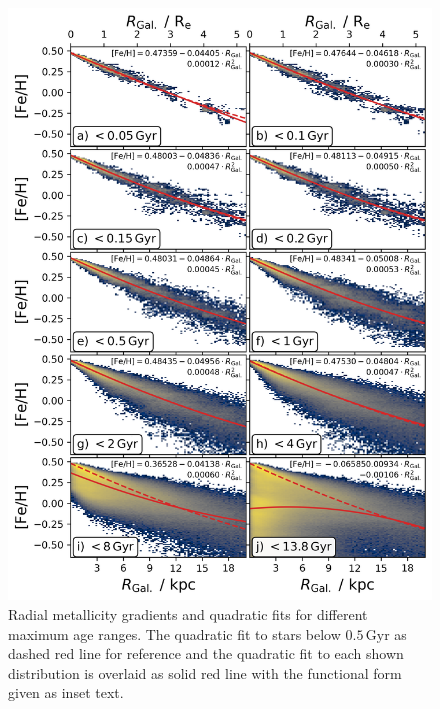 \documentclass[fleqn,usenatbib]{mnras}
\begin{document}
\begin{figure}
    \centering
    \includegraphics[width=\columnwidth]{figures/quadratic_fit_across_maximum_ages.png}
    \caption{Radial metallicity gradients and quadratic fits for different maximum age ranges. The quadratic fit to stars below $0.5\,\mathrm{Gyr}$ as dashed red line for reference and the quadratic fit to each shown distribution is overlaid as solid red line with the functional form given as inset text.}
    \label{fig:quadratic_fit_across_maximum_ages}
\end{figure}
\end{document}
